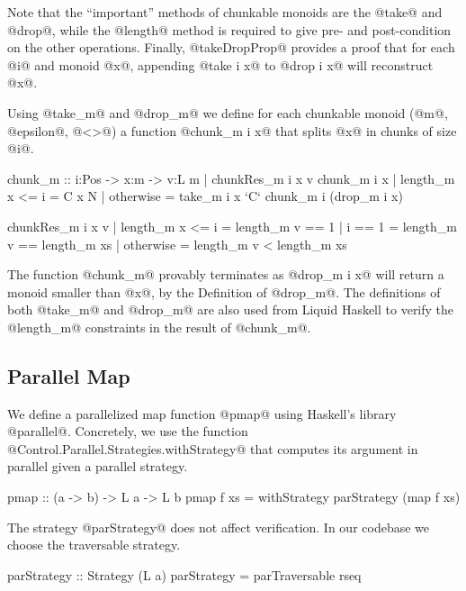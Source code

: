 Note that the ``important'' methods of chunkable monoids
are the @take@ and @drop@, while the @length@ method is required
to give pre- and post-condition on the other operations.
%
Finally, @takeDropProp@ provides a proof that
for each @i@ and monoid @x@, appending
@take i x@ to @drop i x@ will reconstruct @x@.

Using @take_m@ and @drop_m@ we define for each chunkable monoid
(@m@, @epsilon@, @<>@) a function @chunk_m i x@ that
splits @x@ in chunks of size @i@.
\begin{code}
chunk_m :: i:Pos -> x:m -> {v:L m | chunkRes_m i x v }
chunk_m i x
  | length_m x <= i = C x N
  | otherwise     = take_m i x `C` chunk_m i (drop_m i x)

chunkRes_m i x v
  | length_m x <= i = length_m v == 1
  | i == 1        = length_m v == length_m xs
  | otherwise     = length_m v < length_m xs
\end{code}

%
The function @chunk_m@ provably terminates as
@drop_m i x@
will return a monoid smaller than @x@,
by the Definition of @drop_m@.
%
The definitions of both @take_m@ and @drop_m@
are also used from Liquid Haskell to verify the
@length_m@ constraints in the result of @chunk_m@.


\subsection{Parallel Map}
We define a parallelized map function @pmap@
using Haskell's library @parallel@.
%
Concretely, we use the function
@Control.Parallel.Strategies.withStrategy@
that computes its argument in parallel given a parallel strategy.
\begin{code}
pmap :: (a -> b) -> L a -> L b
pmap f xs = withStrategy parStrategy (map f xs)
\end{code}
%
The strategy @parStrategy@ does not affect verification.
%
In our codebase we choose the traversable strategy.
\begin{code}
parStrategy :: Strategy (L a)
parStrategy = parTraversable rseq
\end{code}

